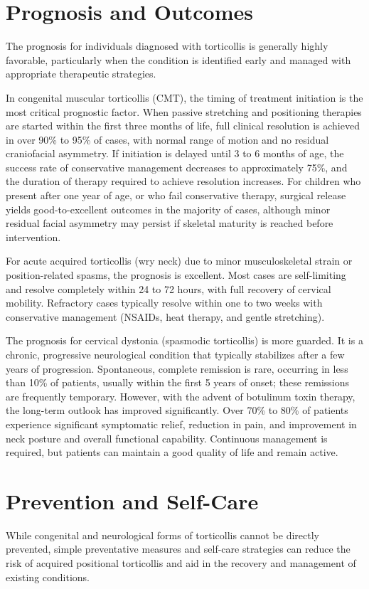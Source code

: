 \section*{Prognosis and Outcomes}
The prognosis for individuals diagnosed with torticollis is generally highly favorable, particularly when the condition is identified early and managed with appropriate therapeutic strategies.

In congenital muscular torticollis (CMT), the timing of treatment initiation is the most critical prognostic factor. When passive stretching and positioning therapies are started within the first three months of life, full clinical resolution is achieved in over 90\% to 95\% of cases, with normal range of motion and no residual craniofacial asymmetry. If initiation is delayed until 3 to 6 months of age, the success rate of conservative management decreases to approximately 75\%, and the duration of therapy required to achieve resolution increases. For children who present after one year of age, or who fail conservative therapy, surgical release yields good-to-excellent outcomes in the majority of cases, although minor residual facial asymmetry may persist if skeletal maturity is reached before intervention.

For acute acquired torticollis (wry neck) due to minor musculoskeletal strain or position-related spasms, the prognosis is excellent. Most cases are self-limiting and resolve completely within 24 to 72 hours, with full recovery of cervical mobility. Refractory cases typically resolve within one to two weeks with conservative management (NSAIDs, heat therapy, and gentle stretching).

The prognosis for cervical dystonia (spasmodic torticollis) is more guarded. It is a chronic, progressive neurological condition that typically stabilizes after a few years of progression. Spontaneous, complete remission is rare, occurring in less than 10\% of patients, usually within the first 5 years of onset; these remissions are frequently temporary. However, with the advent of botulinum toxin therapy, the long-term outlook has improved significantly. Over 70\% to 80\% of patients experience significant symptomatic relief, reduction in pain, and improvement in neck posture and overall functional capability. Continuous management is required, but patients can maintain a good quality of life and remain active.

\section*{Prevention and Self-Care}
While congenital and neurological forms of torticollis cannot be directly prevented, simple preventative measures and self-care strategies can reduce the risk of acquired positional torticollis and aid in the recovery and management of existing conditions.


